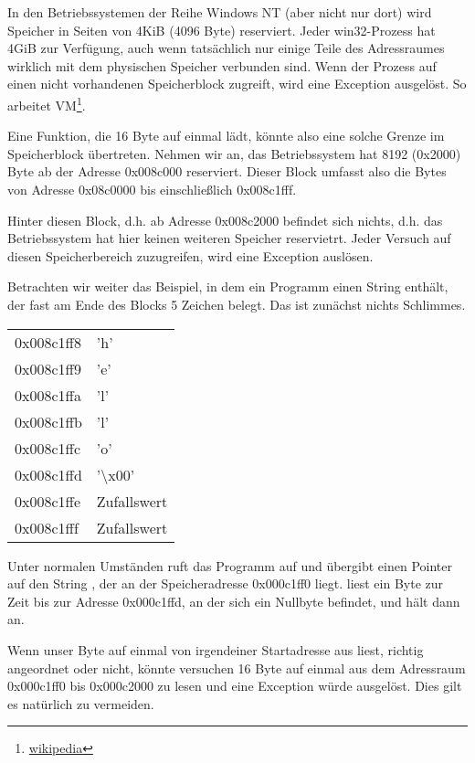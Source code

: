 \newcommand{\URLPAGE}{\href{http://en.wikipedia.org/wiki/Page_(computer_memory)}{wikipedia}}
In den Betriebssystemen der Reihe \gls{Windows NT} (aber nicht nur dort) wird Speicher in Seiten von 4KiB (4096 Byte)
reserviert. Jeder win32-Prozess hat 4GiB zur Verfügung, auch wenn tatsächlich nur einige Teile des Adressraumes wirklich
mit dem physischen Speicher verbunden sind. Wenn der Prozess auf einen nicht vorhandenen Speicherblock zugreift, wird
eine Exception ausgelöst. So arbeitet \ac{VM}\footnote{\URLPAGE}.

Eine Funktion, die 16 Byte auf einmal lädt, könnte also eine solche Grenze im Speicherblock übertreten.
Nehmen wir an, das Betriebssystem hat 8192 (0x2000) Byte ab der Adresse 0x008c000 reserviert.
Dieser Block umfasst also die Bytes von Adresse 0x08c0000 bis einschließlich 0x008c1fff.

Hinter diesen Block, d.h. ab Adresse 0x008c2000 befindet sich nichts, d.h. das Betriebssystem hat hier keinen weiteren
Speicher reservietrt. Jeder Versuch auf diesen Speicherbereich zuzugreifen, wird eine Exception auslösen.

Betrachten wir weiter das Beispiel, in dem ein Programm einen String enthält, der fast am Ende des Blocks 5 Zeichen
belegt. Das ist zunächst nichts Schlimmes.
\begin{center}
  \begin{tabular}{ | l | l | }
    \hline
        0x008c1ff8 & 'h' \\
        0x008c1ff9 & 'e' \\
        0x008c1ffa & 'l' \\
        0x008c1ffb & 'l' \\
        0x008c1ffc & 'o' \\
        0x008c1ffd & '\textbackslash{}x00' \\
        0x008c1ffe & Zufallswert \\
        0x008c1fff & Zufallswert \\
    \hline
  \end{tabular}
\end{center}
Unter normalen Umständen ruft das Programm \strlen auf und übergibt einen Pointer auf den String , der an
der Speicheradresse 0x000c1ff0 liegt.
\strlen liest ein Byte zur Zeit bis zur Adresse 0x000c1ffd, an der sich ein Nullbyte befindet, und hält dann an.

Wenn unser  Byte auf einmal von irgendeiner Startadresse aus liest, richtig angeordnet oder nicht, könnte
\MOVDQU versuchen 16 Byte auf einmal aus dem Adressraum 0x000c1ff0 bis 0x000c2000 zu lesen und eine Exception würde
ausgelöst. Dies gilt es natürlich zu vermeiden.

